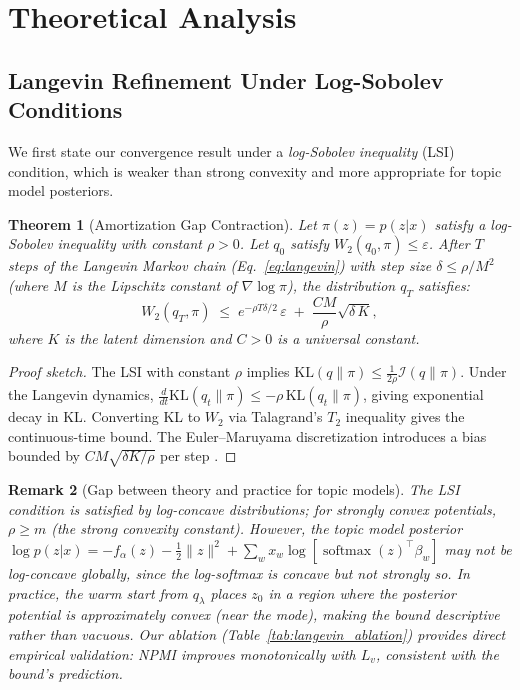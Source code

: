 \documentclass[10pt]{article}
\newtheorem{theorem}{Theorem}[section]
\newtheorem{remark_thm}[theorem]{Remark}
\DeclareMathOperator{\softmax}{softmax}
\begin{document}
\section{Theoretical Analysis}
\label{sec:theory}

\subsection{Langevin Refinement Under Log-Sobolev Conditions}

We first state our convergence result under a \emph{log-Sobolev inequality} (LSI)
condition, which is weaker than strong convexity and more appropriate for topic model
posteriors.

\begin{theorem}[Amortization Gap Contraction]
\label{thm:amort_gap}
Let $\pi(z) = p(z|x)$ satisfy a log-Sobolev inequality with constant $\rho > 0$.
Let $q_0$ satisfy $W_2(q_0, \pi) \le \varepsilon$.
After $T$ steps of the Langevin Markov chain (Eq.~\ref{eq:langevin}) with step size
$\delta \le \rho/M^2$ (where $M$ is the Lipschitz constant of $\nabla \log \pi$),
the distribution $q_T$ satisfies:
\begin{equation}
    W_2(q_T, \pi)
    \;\le\; e^{-\rho T\delta/2}\,\varepsilon
    \;+\; \frac{C M}{\rho}\sqrt{\delta\,K},
    \label{eq:amort_bound}
\end{equation}
where $K$ is the latent dimension and $C > 0$ is a universal constant.
\end{theorem}

\begin{proof}[Proof sketch]
The LSI with constant $\rho$ implies $\mathrm{KL}(q\|\pi) \le \frac{1}{2\rho}\mathcal{I}(q\|\pi)$.
Under the Langevin dynamics, $\frac{d}{dt}\mathrm{KL}(q_t\|\pi) \le -\rho\,\mathrm{KL}(q_t\|\pi)$,
giving exponential decay in KL.
Converting KL to $W_2$ via Talagrand's $T_2$ inequality \citep{otto2000generalization}
gives the continuous-time bound.
The Euler--Maruyama discretization introduces a bias bounded by $CM\sqrt{\delta K/\rho}$
per step \citep{dalalyan2017theoretical}.
\end{proof}

\begin{remark_thm}[Gap between theory and practice for topic models]
\label{rmk:gap}
The LSI condition is satisfied by log-concave distributions; for strongly convex potentials,
$\rho \ge m$ (the strong convexity constant). However, the topic model posterior
$\log p(z|x) = -f_\alpha(z) - \frac{1}{2}\|z\|^2 + \sum_w x_w \log[\softmax(z)^\top \beta_w]$
may not be log-concave globally, since the log-softmax is concave but not strongly so.
In practice, the warm start from $q_\lambda$ places $z_0$ in a region where the
posterior potential is approximately convex (near the mode), making the bound
descriptive rather than vacuous. Our ablation (Table~\ref{tab:langevin_ablation})
provides direct empirical validation: NPMI improves monotonically with $L_v$,
consistent with the bound's prediction.
\end{remark_thm}
\end{document}
